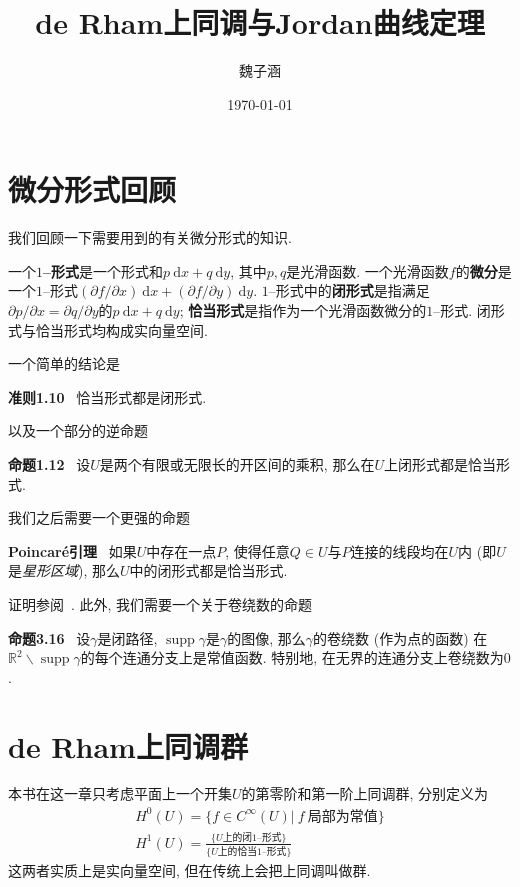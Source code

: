 \documentclass[11pt]{article}
\title{de Rham上同调与Jordan曲线定理}
\author{魏子涵}
\date{\today}
\theoremstyle{definition}\newtheorem*{analyse}{分析}
\def\d#1{\ \mathrm{d}#1}
\newenvironment{env}[1]{\par\vspace{1em}\noindent\textbf{#1}\ }{\par\vspace{1em}}
\DeclareMathOperator{\supp}{supp}
\begin{document}
\maketitle

\setcounter{section}{-1}
\section{微分形式回顾}
我们回顾一下需要用到的有关微分形式的知识.

一个\textbf{$1$--形式}是一个形式和$p\d{x}+q\d{y}$, 其中$p,q$是光滑函数.
一个光滑函数$f$的\textbf{微分}是一个$1$--形式$(\partial f/\partial x)\d{x}+(\partial f/\partial y)\d{y}$.
$1$--形式中的\textbf{闭形式}是指满足$\partial p/\partial x=\partial q/\partial y$的$p\d{x}+q\d{y}$;
\textbf{恰当形式}是指作为一个光滑函数微分的$1$--形式.
闭形式与恰当形式均构成实向量空间.

一个简单的结论是
\begin{env}{准则1.10}
    恰当形式都是闭形式. \cite[p.\ 10]{Fulton1995}
\end{env}

以及一个部分的逆命题
\begin{env}{命题1.12}
    设$U$是两个有限或无限长的开区间的乘积, 那么在$U$上闭形式都是恰当形式.
\end{env}

我们之后需要一个更强的命题
\begin{env}{Poincar\'{e}引理}
    如果$U$中存在一点$P$, 使得任意$Q\in U$与$P$连接的线段均在$U$内 (即$U$是\textit{星形区域}), 那么$U$中的闭形式都是恰当形式.
\end{env}

证明参阅~\cite[定理4.11]{Spivak1965}.
此外, 我们需要一个关于卷绕数的命题
\begin{env}{命题3.16}
    设$\gamma$是闭路径, $\supp\gamma$是$\gamma$的图像,
    那么$\gamma$的卷绕数 (作为点的函数) 在$\mathbb{R}^2\backslash\supp\gamma$的每个连通分支上是常值函数.
    特别地, 在无界的连通分支上卷绕数为$0$.
\end{env}

\section{de Rham上同调群}
本书在这一章只考虑平面上一个开集$U$的第零阶和第一阶上同调群, 分别定义为
\begin{gather*}
    H^0(U)=\{f\in C^\infty(U)|\ f\ \text{局部为常值}\}\\
    H^1(U)=\frac{\{U\text{上的闭}1\text{--形式}\}}{\{U\text{上的恰当}1\text{--形式}\}}
\end{gather*}
这两者实质上是实向量空间, 但在传统上会把上同调叫做群.
\end{document}
